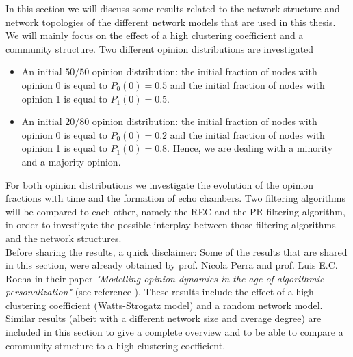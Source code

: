 \documentclass[11 pt , letterpaper , twoside , openright]{book}
\begin{document}
In this section we will discuss some results related to the network structure and network topologies of the different network models that are used in this thesis. We will mainly focus on the effect of a high clustering coefficient and a community structure. Two different opinion distributions are investigated
\begin{itemize}
	\item An initial $50/50$ opinion distribution: the initial fraction of nodes with opinion 0 is equal to $P_0(0) = 0.5$ and the initial fraction of nodes with opinion 1 is equal to $P_1(0) = 0.5$.
	\item An initial $20/80$ opinion distribution: the initial fraction of nodes with opinion 0 is equal to $P_0(0) = 0.2$ and the initial fraction of nodes with opinion 1 is equal to $P_1(0) = 0.8$. Hence, we are dealing with a minority and a majority opinion.
\end{itemize}
For both opinion distributions we investigate the evolution of the opinion fractions with time and the formation of echo chambers. Two filtering algorithms will be compared to each other, namely the REC and the PR filtering algorithm, in order to investigate the possible interplay between those filtering algorithms and the network structures.\\
\newline
Before sharing the results, a quick disclaimer: Some of the results that are shared in this section, were already obtained by prof. Nicola Perra and prof. Luis E.C. Rocha in their paper \textit{"Modelling opinion dynamics in the age of algorithmic personalization"} (see reference \cite{Perra2019}). These results include the effect of a high clustering coefficient (Watts-Strogatz model) and a random network model. Similar results (albeit with a different network size and average degree) are included in this section to give a complete overview and to be able to compare a community structure to a high clustering coefficient. 
\end{document}
